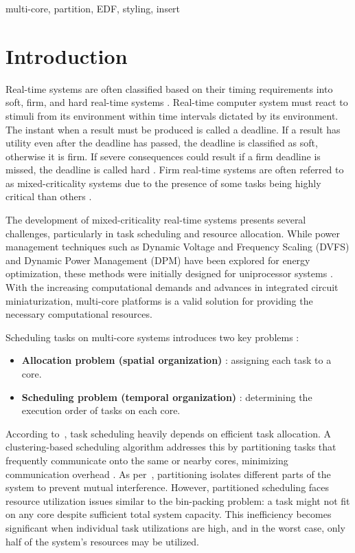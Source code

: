 \documentclass[conference]{IEEEtran}
\begin{document}
\begin{IEEEkeywords}
multi-core, partition, EDF, styling, insert
\end{IEEEkeywords}

\section{Introduction}
Real-time systems are often classified based on their timing requirements into soft, firm, and hard real-time systems \cite{6122386}.  Real-time computer system must react to stimuli from its environment within time intervals dictated by its environment. The instant when a result must be produced is called a deadline. If a result has utility even after the deadline has passed, the deadline is classified as soft, otherwise it is firm. If severe consequences could result if a firm deadline is missed, the deadline is called hard \cite{kopetzDist}. Firm real-time systems are often referred to as mixed-criticality systems due to the presence of some tasks being highly critical than others \cite{zamora2013}.

The development of mixed-criticality real-time systems presents several challenges, particularly in task scheduling and resource allocation. While power management techniques such as Dynamic Voltage and Frequency Scaling (DVFS) and Dynamic Power Management (DPM) have been explored for energy optimization, these methods were initially designed for uniprocessor systems \cite{6122386}. With the increasing computational demands and advances in integrated circuit miniaturization, multi-core platforms is a valid solution for providing the necessary computational resources.

Scheduling tasks on multi-core systems introduces two key problems \cite{AbdallahGB24}:
\begin{itemize}
    \item \textbf{Allocation problem (spatial organization)} : assigning each task to a core.
    \item \textbf{Scheduling problem (temporal organization)} : determining the execution order of tasks on each core.
\end{itemize}

According to~\cite{7832222}, task scheduling heavily depends on efficient task allocation. A clustering-based scheduling algorithm addresses this by partitioning tasks that frequently communicate onto the same or nearby cores, minimizing communication overhead \cite{AbdallahGB24}. As per~\cite{zamora2013}, partitioning isolates different parts of the system to prevent mutual interference. However, partitioned scheduling faces resource utilization issues similar to the bin-packing problem: a task might not fit on any core despite sufficient total system capacity. This inefficiency becomes significant when individual task utilizations are high, and in the worst case, only half of the system’s resources may be utilized.
\end{document}

